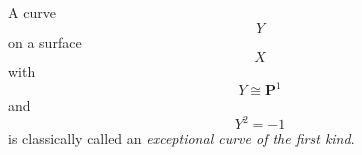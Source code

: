 A curve $$Y$$ on a surface $$X$$ with $$Y \cong \mathbf{P}^1$$ and $$Y^2 = -1$$ is classically called an \textit{exceptional curve of the first kind}.
